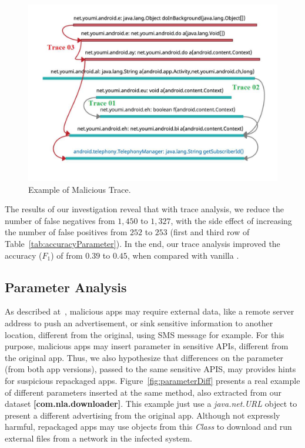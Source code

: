 \begin{figure}
\centering
\includegraphics[scale=0.28]{images/maliciousTrace_example01.pdf}
\caption{Example of Malicious Trace.}
 \label{fig:maliciousTrace}
\end{figure}


The results of our investigation reveal that with trace analysis, we reduce the number of false negatives from $1,450$ to $1,327$, with the side effect of increasing the number of false positives from $252$ to $253$ (first and third row of Table~\ref{tab:accuracyParameter}). In the end, our trace analysis improved the accuracy ($F_1$) of \mas from $0.39$ to $0.45$, when compared with vanilla \mas.


\subsection{Parameter Analysis}

As described at~\cite{le2018towards}, malicious apps may require external data, like a remote server address to push an advertisement, or sink sensitive information to another location, different from the original, using SMS message for example. For this purpose, malicious apps may insert parameter in sensitive APIs, different from the original app. Thus, we also hypothesize that differences on the parameter (from both app versions), passed to the same sensitive APIS, may provides hints for suspicious repackaged apps. Figure~\ref{fig:parameterDiff} presents a real example of different parameters inserted at the same method, also extracted from our dataset \textbf{[com.nla.downloader]}. This example just use a \textit{java.net.URL} object to present a different advertising from the original app. Although not expressly harmful, repackaged apps may use objects from this \textit{Class} to download and run external files from a network in the infected system\cite{DBLP:journals/compsec/ObaidatSPP22}.

